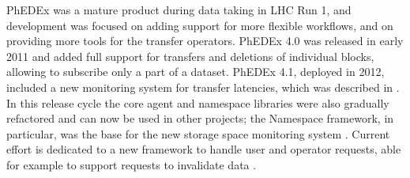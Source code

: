 PhEDEx was a mature product during data taking in LHC Run 1, and development was focused on adding support for more flexible workflows, and on providing more tools for the transfer operators.
PhEDEx 4.0 was released in early 2011 and added full support for transfers and deletions of individual blocks, allowing to subscribe only a part of a dataset. PhEDEx 4.1, deployed in 2012, included a new monitoring system for transfer latencies, which was described in \cite{phedexlatency}.
In this release cycle the core agent and namespace libraries were also gradually refactored \cite{phedexframework} and can now be used in other projects; the Namespace framework, in particular, was the base for the new storage space monitoring system \cite{storagemon}.
Current effort is dedicated to a new framework to handle user and operator requests, able for example to support requests to invalidate data \cite{phedexrequests}.
